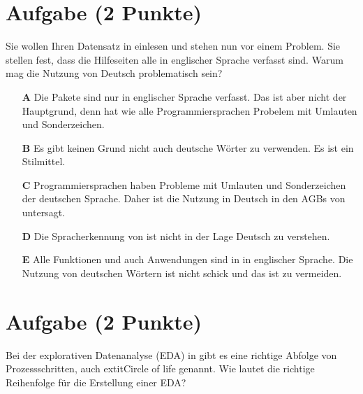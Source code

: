\documentclass[a4paper, 9pt]{scrartcl}\usepackage[]{graphicx}\usepackage[]{xcolor}
\begin{document}
\section{Aufgabe \hfill (2 Punkte)}



Sie wollen Ihren Datensatz in \Rlogo einlesen und stehen nun vor einem Problem. Sie stellen fest, dass die Hilfeseiten alle in englischer Sprache verfasst sind. Warum mag die Nutzung von Deutsch problematisch sein?



\begin{enumerate}
\item [\textbf{A} \msquare] Die \Rlogo Pakete sind nur in englischer Sprache verfasst. Das ist aber nicht der Hauptgrund, denn \Rlogo hat wie alle Programmiersprachen Probelem mit Umlauten und Sonderzeichen.
\item [\textbf{B} \msquare] Es gibt keinen Grund nicht auch deutsche Wörter zu verwenden. Es ist ein Stilmittel.
\item [\textbf{C} \msquare] Programmiersprachen haben Probleme mit Umlauten und Sonderzeichen der deutschen Sprache. Daher ist die Nutzung in Deutsch in den AGBs von \Rlogo untersagt.
\item [\textbf{D} \msquare] Die Spracherkennung von \Rlogo ist nicht in der Lage Deutsch zu verstehen.
\item [\textbf{E} \msquare] Alle Funktionen und auch Anwendungen sind in \Rlogo in englischer Sprache. Die Nutzung von deutschen Wörtern ist nicht schick und das ist zu vermeiden.
\end{enumerate}

\section{Aufgabe \hfill (2 Punkte)}



Bei der explorativen Datenanalyse (EDA) in \Rlogo gibt es eine richtige Abfolge von Prozessschritten, auch 	extit{Circle of life} genannt. Wie lautet die richtige Reihenfolge für die Erstellung einer EDA?
\end{document}
